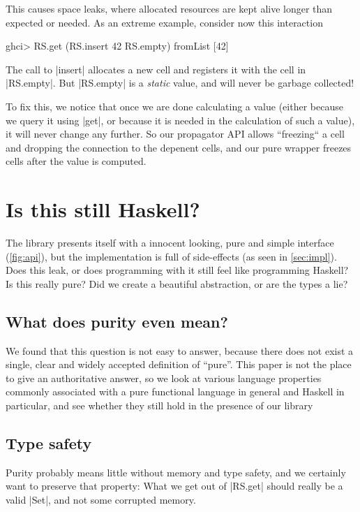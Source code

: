 \documentclass[manuscript,anonymous,screen,acmsmall]{acmart}
\begin{document}
This causes space leaks, where allocated resources are kept alive longer than expected or needed. As an extreme example, consider now this interaction
\begin{code}
ghci> RS.get (RS.insert 42 RS.empty)
fromList [42]
\end{code}
The call to |insert| allocates a new cell and registers it with the cell in |RS.empty|. But |RS.empty| is a \emph{static} value, and will never be garbage collected!

To fix this, we notice that once we are done calculating a value (either because we query it using |get|, or because it is needed in the calculation of such a value), it will never change any further. So our propagator API allows “freezing“ a cell and dropping the connection to the depenent cells, and our pure wrapper freezes cells after the value is computed.

\section{Is this still Haskell?}\label{sec:pure}

The library presents itself with a innocent looking, pure and simple interface (\cref{fig:api}), but the implementation is full of side-effects (as seen in \cref{sec:impl}).
Does this leak, or does programming with it still feel like programming Haskell?
Is this really pure? Did we create a beautiful abstraction, or are the types a lie?

\subsection{What does purity even mean?}

We found that this question is not easy to answer, because there does not exist a single, clear and widely accepted definition of “pure”.
This paper is not the place to give an authoritative answer, so we look at various language properties commonly associated with a pure functional language in general and Haskell in particular,
and see whether they still hold in the presence of our library

\subsection{Type safety}

Purity probably means little without memory and type safety, and we certainly want to preserve that property: What we get out of |RS.get| should really be a valid |Set|, and not some corrupted memory.
\end{document}

